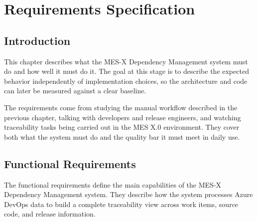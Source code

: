 
\chapter{Requirements Specification}
\label{chap:requirements}

% 
\section{Introduction}
\label{sec:req-intro}

This chapter describes what the MES-X Dependency Management system must do and
how well it must do it. The goal at this stage is to describe the expected
behavior independently of implementation choices, so the architecture and code
can later be measured against a clear baseline.

The requirements come from studying the manual workflow described in the
previous chapter, talking with developers and release engineers, and watching
traceability tasks being carried out in the MES X.0 environment. They cover
both what the system must do and the quality bar it must meet in daily use.


% 
\section{Functional Requirements}
\label{sec:functional-requirements}

The functional requirements define the main capabilities of the MES-X Dependency Management system.
They describe how the system processes Azure DevOps data to build a complete traceability view across work items, source code, and release information.

